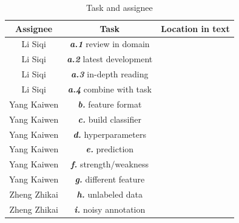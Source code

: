 \documentclass{article}
\begin{document}
\begin{table}[h]
    \centering
    \begin{tabular}{ |c|c|c| }
         Assignee&  Task& Location in text\\\hline
         Li Siqi&  \textbf{\textit{a.1}}  review in domain& \hypertarget{hhpa.1}{{\color{red}{\hyperlink{hpa.1}{task a.1}}}}\\ 
         Li Siqi&  \textbf{\textit{a.2}}  latest development& \hypertarget{hhpa.2}{{\color{red}{\hyperlink{hpa.2}{task a.2}}}}\\ 
         Li Siqi&  \textbf{\textit{a.3}}  in-depth reading& \hypertarget{hhpa.3}{{\color{red}{\hyperlink{hpa.3}{task a.3}}}}\\ 
         Li Siqi&  \textbf{\textit{a.4}}  combine with task& \hypertarget{hhpa.4}{{\color{red}{\hyperlink{hpa.4}{task a.4}}}}\\ 
         Yang Kaiwen&  \textbf{\textit{b.}}  feature format& \hypertarget{hhpb}{{\color{red}{\hyperlink{hpb}{task b}}}}\\ 
         Yang Kaiwen&  \textbf{\textit{c.}}  build classifier& \hypertarget{hhpc}{{\color{red}{\hyperlink{hpc}{task c}}}}\\ 
         Yang Kaiwen&  \textbf{\textit{d.}}  hyperparameters& \hypertarget{hhpd}{{\color{red}{\hyperlink{hpd}{task d}}}}\\ 
         Yang Kaiwen&  \textbf{\textit{e.}}  prediction& \hypertarget{hhpe}{{\color{red}{\hyperlink{hpe}{task e}}}}\\ 
         Yang Kaiwen&  \textbf{\textit{f.}}  strength/weakness& \hypertarget{hhpf}{{\color{red}{\hyperlink{hpf}{task f}}}}\\ 
         Yang Kaiwen&  \textbf{\textit{g.}}  different feature& \hypertarget{hhpg}{{\color{red}{\hyperlink{hpg}{task g}}}}\\ 
         Zheng Zhikai&  \textbf{\textit{h.}}  unlabeled data& \hypertarget{hhph}{{\color{red}{\hyperlink{hph}{task h}}}}\\ 
         Zheng Zhikai&  \textbf{\textit{i.}}  noisy annotation& \hypertarget{hhpi}{{\color{red}{\hyperlink{hpi}{task i}}}}\\ 
    \end{tabular}
    \caption{Task and assignee}
    \label{tab:my_label1}
\end{table}
\end{document}
